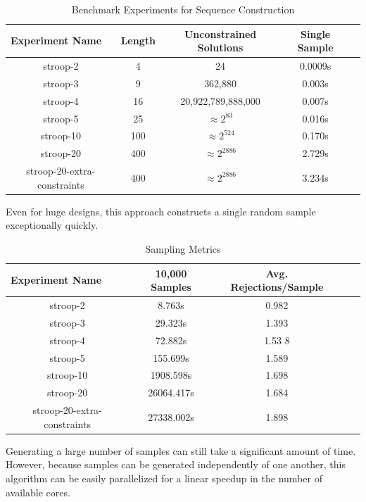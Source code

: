 \begin{table}[htb]
  \centering
  \caption{Benchmark Experiments for Sequence Construction}
\begin{tabular}{|c|c|c|c|c|}
\hline
\multicolumn{1}{|l|}{Experiment Name} & Length          & Unconstrained Solutions  & Single Sample  \\ \hline
stroop-2                              & 4               & 24                       & 0.0009s        \\ \hline
stroop-3                              & 9               & 362,880                  & 0.003s         \\ \hline
stroop-4                              & 16              & 20,922,789,888,000       & 0.007s         \\ \hline
stroop-5                              & 25              & $\approx 2^{83}$         & 0.016s         \\ \hline
stroop-10                             & 100             & $\approx 2^{524}$        & 0.170s         \\ \hline
stroop-20                             & 400             & $\approx 2^{2886}$       & 2.729s         \\ \hline
stroop-20-extra-constraints           & 400             & $\approx 2^{2886}$       & 3.234s         \\ \hline
\end{tabular}
\label{tab:benchmark_experiments_construction}
\end{table}

Even for huge designs, this approach constructs a single random sample exceptionally quickly.

\begin{table}[htb]
  \centering
  \caption{Sampling Metrics}
\begin{tabular}{|c|c|c|c|c|}
\hline
\multicolumn{1}{|l|}{Experiment Name} & 10,000 Samples & Avg. Rejections/Sample  \\ \hline
stroop-2                              & 8.763s         & 0.982                   \\ \hline
stroop-3                              & 29.323s        & 1.393                   \\ \hline
stroop-4                              & 72.882s        & 1.53
8                   \\ \hline
stroop-5                              & 155.699s       & 1.589                   \\ \hline
stroop-10                             & 1908.598s      & 1.698                   \\ \hline
stroop-20                             & 26064.417s     & 1.684                   \\ \hline
stroop-20-extra-constraints           & 27338.002s     & 1.898                   \\ \hline
\end{tabular}
\label{tab:sampling_metrics}
\end{table}

Generating a large number of samples can still take a significant amount of time. However, because samples can be generated independently of one another, this algorithm can be easily parallelized for a linear speedup in the number of available cores.
